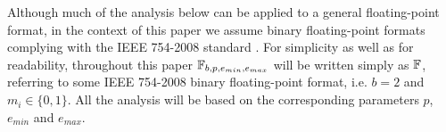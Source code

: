   Although much of the analysis below can be applied to a general floating-point
  format, in the context of this paper we assume binary floating-point formats complying with the IEEE 754-2008 standard \cite{ieee754}.
  For simplicity as well as for readability, throughout this paper
  $\mathbb{F}_{b,p,e_{min},e_{max}}$ will be written simply as $\mathbb{F}$, referring to
  some IEEE 754-2008 binary floating-point format,
  i.e. $b=2$ and $m_i \in \{0, 1\}$.
  All the analysis will be based on the corresponding parameters $p$, $e_{min}$
  and $e_{max}$.

  \begin{comment}
    While the analysis below applies for any chosen values of $p$, $e_{\min}$, and $e_{\max}$ 
    (provided that $p << e_{\max} - e_{\min}$), our software is implemented in IEEE 754-2008
     single and double precision.
  \end{comment}

  \begin{comment}
  Specific parameters for those two formats are given in Table \ref{tbl:IEEE-754}.
  \begin{table}[!htbp]
    \caption{IEEE 754-2008 binary floating-point formats}
    \label{tbl:IEEE-754}
        \centering
        \begin{tabular}{ | l | l | l | } \hline
            Floating-Point Type & single precision & double precision \\ \hline
            C data type & \texttt{float} & \texttt{double} \\ \hline
            $p$ & 24 & 53 \\ \hline
            Exponent field width & 8 & 11 \\ \hline
            Exponent bias & 127 & 1023 \\ \hline
            $e_{min}$ & -126 & -1022 \\ \hline
            $e_{max}$ & 127 & 1023 \\ \hline
        \end{tabular}
  \end{table}

  The exponent is stored in internal representation in biased form
  using 8 bits for single precision, and 11 bits for double precision.
  The exponent of a represented floating-point number is equal to
  the biased exponent (the unsigned integer value stored in the exponent field)
  minus the bias value (see table~\ref{tbl:IEEE-754}).
  An exponent field with all bits set to 0 is reserved for zeros and denormalized values.
  An exponent field with all bits set to 1 is reserved for infinities and NaN.
  \end{comment}

